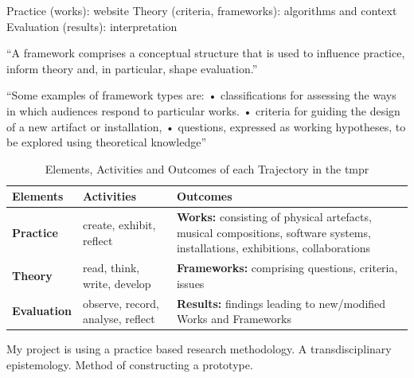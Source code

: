 Practice (works): website
Theory (criteria, frameworks): algorithms and context
Evaluation (results): interpretation


``A framework comprises a conceptual structure that is used to influence practice, inform theory and, in particular, shape evaluation.''

``Some examples of framework types are:
• classifications for assessing the ways in which audiences respond to particular works.
• criteria for guiding the design of a new artifact or installation,
• questions, expressed as working hypotheses, to be explored using theoretical knowledge''

\begin{table}[htb]
  \begin{tabu}{X[1]X[2]X[3]}
  \toprule
  \textbf{Elements}
  &
  \textbf{Activities}
  &
  \textbf{Outcomes}
  \\ \midrule
  \textbf{Practice}
  &
  create, exhibit, reflect
  &
  \textbf{Works:} consisting of physical artefacts, musical compositions, software systems, installations, exhibitions, collaborations
  \\ \midrule
  \textbf{Theory}
  &
  read, think, write, develop
  &
  \textbf{Frameworks:} comprising questions, criteria, issues
  \\ \midrule
  \textbf{Evaluation}
  &
  observe, record, analyse, reflect
  &
  \textbf{Results:} findings leading to new/modified Works and Frameworks
  \\ \bottomrule
  \end{tabu}
\caption[Elements, Activities and Outcomes of the \gls{tmpr}]{Elements, Activities and Outcomes of each Trajectory in the \gls{tmpr}}
\label{tmprtable}
\end{table}

\begin{fcom}
  My project is using a practice based research methodology. A transdisciplinary epistemology. Method of constructing a prototype.
\end{fcom}

\stopcontents[chapters]
